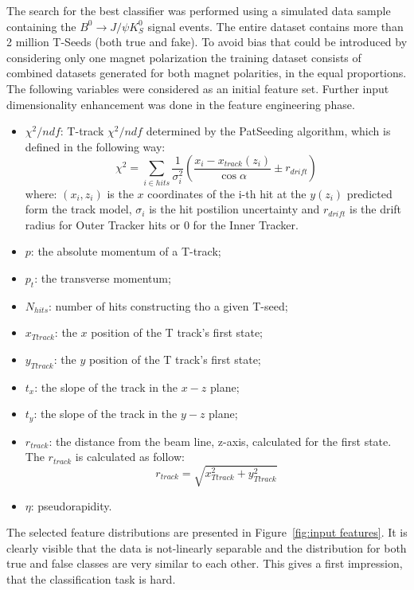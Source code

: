 The search for the best classifier was performed using a simulated data sample containing the $B^0\rightarrow J/\psi K_S^0 $ signal events. The entire dataset contains more than 2 million T-Seeds (both true and fake). To avoid bias that could be introduced by considering only one magnet polarization the training dataset consists of combined datasets generated for both magnet polarities, in the equal proportions.  
The following variables were considered as an initial feature set. Further input dimensionality enhancement was done in the feature engineering phase. 

\begin{itemize}
    \item $\chi^2/ndf$: T-track $\chi^2/ndf$ determined by the PatSeeding algorithm, which is defined in the following way: 
    \begin{equation}
        \chi^2 = \sum_{i \in hits} \frac{1}{\sigma_i^2} \left( \frac{x_i-x_{track}(z_i)}{\cos \alpha} \pm r_{drift} \right) 
    \end{equation}
    where: $(x_i, z_i)$ is the $x$ coordinates of the i-th hit at the $y(z_i)$ predicted form the track model, $\sigma_i$ is the hit postilion uncertainty and $r_{drift}$ is the drift radius for Outer Tracker hits or 0 for the Inner Tracker. 
    \item $p$: the absolute momentum of a T-track; 
    \item $p_t$: the transverse momentum;
    \item $N_{hits}$: number of hits constructing tho a given T-seed;
    \item $x_{T track}$: the $x$ position of the T track's first state; 
    \item $y_{T track}$: the $y$ position of the T track's first state;
    \item $t_x$: the slope of the track in the $x-z$ plane;
    \item $t_y$: the slope of the track in the $y-z$ plane;
    \item $r_{track}$: the distance from the beam line, z-axis, calculated for the first state. The $r_{track}$ is calculated as follow:
    \begin{equation}
        r_{track} = \sqrt{x_{T track}^2 + y_{T track}^2}
    \end{equation}
    \item $\eta$: pseudorapidity. 
\end{itemize}

The selected feature distributions are presented in Figure~\ref{fig:input features}. It is clearly visible that the data is not-linearly separable and the distribution for both true and false classes are very similar to each other. This gives a first impression, that the classification task is hard. 

